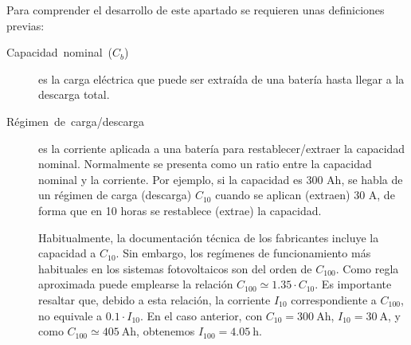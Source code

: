 Para comprender el desarrollo de este apartado se requieren unas definiciones
previas:
\begin{description}
\item [{Capacidad~nominal~($C_{b}$)}] es la carga eléctrica que puede
ser extraída de una batería hasta llegar a la descarga total.  
\item [{Régimen~de~carga/descarga}] es la corriente aplicada a una batería
para restablecer/extraer la capacidad nominal. Normalmente se presenta
como un ratio entre la capacidad nominal y la corriente. Por ejemplo,
si la capacidad es 300 Ah, se habla de un régimen de carga (descarga)
$C_{10}$ cuando se aplican (extraen) 30 A, de forma que en 10 horas
se restablece (extrae) la capacidad. 

Habitualmente, la documentación técnica de los fabricantes incluye la
capacidad a $C_{10}$. Sin embargo, los regímenes de funcionamiento más
habituales en los sistemas fotovoltaicos son del orden de
$C_{100}$. Como regla aproximada puede emplearse la relación $C_{100}
\simeq 1.35 \cdot C_{10}$. Es importante resaltar que, debido a esta relación, la corriente $I_{10}$
correspondiente a $C_{100}$, no equivale a $0.1 \cdot I_{10}$. En el
caso anterior, con $C_{10}=\SI{300}{\ampere\hour}$,
$I_{10}=\SI{30}{\ampere}$, y como $C_{100}\simeq
\SI{405}{\ampere\hour}$, obtenemos $I_{100}=\SI{4.05}{\hour}$.


\end{description}

